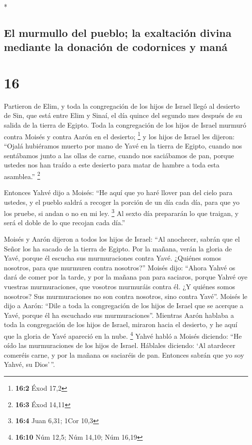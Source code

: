 \begin{paracol}{2}
\begin{otherlanguage}{english}
\end{otherlanguage}

\switchcolumn[0]*

\hypertarget{el-murmullo-del-pueblo-la-exaltaciuxf3n-divina-mediante-la-donaciuxf3n-de-codornices-y-manuxe1}{%
\subsection{El murmullo del pueblo; la exaltación divina mediante la
donación de codornices y
maná}\label{el-murmullo-del-pueblo-la-exaltaciuxf3n-divina-mediante-la-donaciuxf3n-de-codornices-y-manuxe1}}

\hypertarget{section-30}{%
\section{16}\label{section-30}}

 Partieron de Elim, y toda la congregación de los hijos de
Israel llegó al desierto de Sin, que está entre Elim y Sinaí, el día
quince del segundo mes después de su salida de la tierra de Egipto.
 Toda la congregación de los hijos de Israel murmuró
contra Moisés y contra Aarón en el desierto; \footnote{\textbf{16:2}
  Éxod 17,2}  y los hijos de Israel les dijeron: ``Ojalá
hubiéramos muerto por mano de Yavé en la tierra de Egipto, cuando nos
sentábamos junto a las ollas de carne, cuando nos saciábamos de pan,
porque ustedes nos han traído a este desierto para matar de hambre a
toda esta asamblea.'' \footnote{\textbf{16:3} Éxod 14,11}

 Entonces Yahvé dijo a Moisés: ``He aquí que yo haré
llover pan del cielo para ustedes, y el pueblo saldrá a recoger la
porción de un día cada día, para que yo los pruebe, si andan o no en mi
ley. \footnote{\textbf{16:4} Juan 6,31; 1Cor 10,3}  Al
sexto día prepararán lo que traigan, y será el doble de lo que recojan
cada día.''

 Moisés y Aarón dijeron a todos los hijos de Israel: ``Al
anochecer, sabrán que el Señor los ha sacado de la tierra de Egipto.
 Por la mañana, verán la gloria de Yavé, porque él escucha
sus murmuraciones contra Yavé. ¿Quiénes somos nosotros, para que
murmuren contra nosotros?''  Moisés dijo: ``Ahora Yahvé os
dará de comer por la tarde, y por la mañana pan para saciaros, porque
Yahvé oye vuestras murmuraciones, que vosotros murmuráis contra él. ¿Y
quiénes somos nosotros? Sus murmuraciones no son contra nosotros, sino
contra Yavé''.  Moisés le dijo a Aarón: ``Dile a toda la
congregación de los hijos de Israel que se acerque a Yavé, porque él ha
escuchado sus murmuraciones''.  Mientras Aarón hablaba a
toda la congregación de los hijos de Israel, miraron hacia el desierto,
y he aquí que la gloria de Yavé apareció en la nube. \footnote{\textbf{16:10}
  Núm 12,5; Núm 14,10; Núm 16,19}  Yahvé habló a Moisés
diciendo:  ``He oído las murmuraciones de los hijos de
Israel. Háblales diciendo: `Al atardecer comeréis carne, y por la mañana
os saciaréis de pan. Entonces sabrán que yo soy Yahvé, su Dios'\,''.


\end{paracol}
